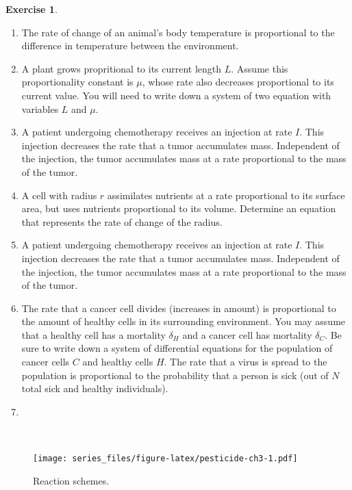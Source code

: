 \documentclass[
]{book}
\theoremstyle{definition}
\theoremstyle{definition}
\theoremstyle{definition}
\newtheorem{exercise}{Exercise}[chapter]
\theoremstyle{remark}
\begin{document}
\begin{exercise}
\begin{enumerate}[label=\alph*.]
\item The rate of change of an animal's body temperature is proportional to the difference in temperature between the environment.
\item A plant grows propritional to its current length $L$.  Assume this proportionality constant is $\mu$, whose rate also decreases proportional to its current value.  You will need to write down a system of two equation with variables $L$ and $\mu$.
\item A patient undergoing chemotherapy receives an injection at rate $I$. This injection decreases the rate that a tumor accumulates mass. Independent of the injection, the tumor accumulates mass at a rate proportional to the mass of the tumor.
\item A cell with radius $r$ assimilates nutrients at a rate proportional to its surface area, but uses nutrients proportional to its volume. Determine an equation that represents the rate of change of the radius. 
\item A patient undergoing chemotherapy receives an injection at rate $I$. This injection decreases the rate that a tumor accumulates mass. Independent of the injection, the tumor accumulates mass at a rate proportional to the mass of the tumor.
\item The rate that a cancer cell divides (increases in amount) is proportional to the amount of healthy cells in its surrounding environment.  You may assume that a healthy cell has a mortality $\delta_{H}$ and a cancer cell has mortality $\delta_{C}$.  Be sure to write down a system of differential equations for the population of cancer cells $C$ and healthy cells $H$.
The rate that a virus is spread to the population is proportional to the probability that a person is sick (out of $N$ total sick and healthy individuals). 
\item
\end{enumerate}
\end{exercise}

~

\begin{figure}
\centering
\texttt{[image: series\_files/figure-latex/pesticide-ch3-1.pdf]}
\caption{\label{fig:pesticide-ch3}Reaction schemes.}
\end{figure}
\end{document}
